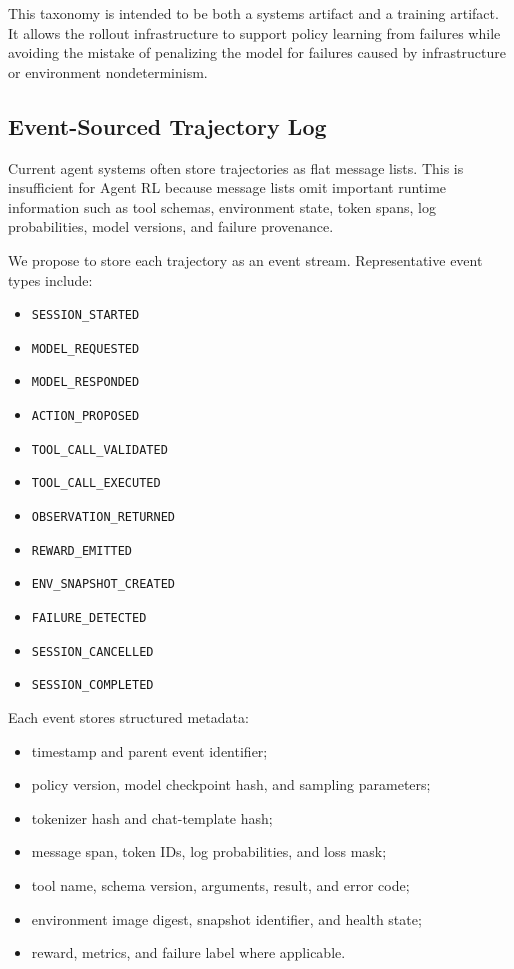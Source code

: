 \documentclass[11pt]{article}
\begin{document}
This taxonomy is intended to be both a systems artifact and a training artifact.
It allows the rollout infrastructure to support policy learning from failures while avoiding the mistake of penalizing the model for failures caused by infrastructure or environment nondeterminism.

\subsection{Event-Sourced Trajectory Log}

Current agent systems often store trajectories as flat message lists.
This is insufficient for Agent RL because message lists omit important runtime information such as tool schemas, environment state, token spans, log probabilities, model versions, and failure provenance.

We propose to store each trajectory as an event stream.
Representative event types include:

\begin{itemize}[leftmargin=*]
    \item \texttt{SESSION\_STARTED}
    \item \texttt{MODEL\_REQUESTED}
    \item \texttt{MODEL\_RESPONDED}
    \item \texttt{ACTION\_PROPOSED}
    \item \texttt{TOOL\_CALL\_VALIDATED}
    \item \texttt{TOOL\_CALL\_EXECUTED}
    \item \texttt{OBSERVATION\_RETURNED}
    \item \texttt{REWARD\_EMITTED}
    \item \texttt{ENV\_SNAPSHOT\_CREATED}
    \item \texttt{FAILURE\_DETECTED}
    \item \texttt{SESSION\_CANCELLED}
    \item \texttt{SESSION\_COMPLETED}
\end{itemize}

Each event stores structured metadata:

\begin{itemize}[leftmargin=*]
    \item timestamp and parent event identifier;
    \item policy version, model checkpoint hash, and sampling parameters;
    \item tokenizer hash and chat-template hash;
    \item message span, token IDs, log probabilities, and loss mask;
    \item tool name, schema version, arguments, result, and error code;
    \item environment image digest, snapshot identifier, and health state;
    \item reward, metrics, and failure label where applicable.
\end{itemize}
\end{document}

